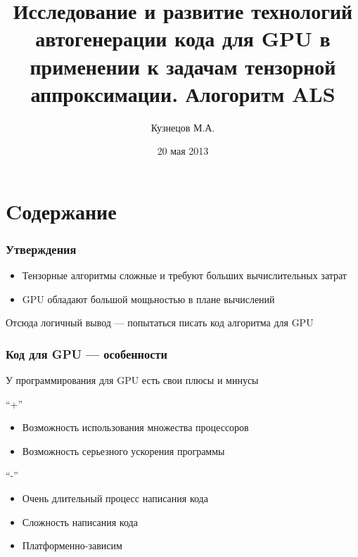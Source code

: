 \documentclass[presentation]{beamer}
\title{Исследование и развитие технологий автогенерации кода для GPU в применении к задачам тензорной аппроксимации. Алогоритм ALS}
\author{Кузнецов М.А.}
\date{20 мая 2013}
\begin{document}
\maketitle



\section{Cодержание}
\label{sec-1}
\begin{frame}
\frametitle{Утверждения}
\label{sec-1-1}

\begin{itemize}
\item Тензорные алгоритмы сложные и требуют больших вычислительных затрат
\item GPU обладают большой мощьностью в плане вычислений
\end{itemize}
Отсюда логичный вывод --- попытаться писать код алгоритма для GPU
\end{frame}
\begin{frame}
\frametitle{Код для GPU --- особенности}
\label{sec-1-2}

У программирования для GPU есть свои плюсы и минусы

``+''
\begin{itemize}
\item Возможность использования множества процессоров
\item Возможность серьезного ускорения программы
\end{itemize}
``-''
\begin{itemize}
\item Очень длительный процесс написания кода
\item Сложность написания кода
\item Платформенно-зависим
\end{itemize}
\end{frame}
\end{document}
